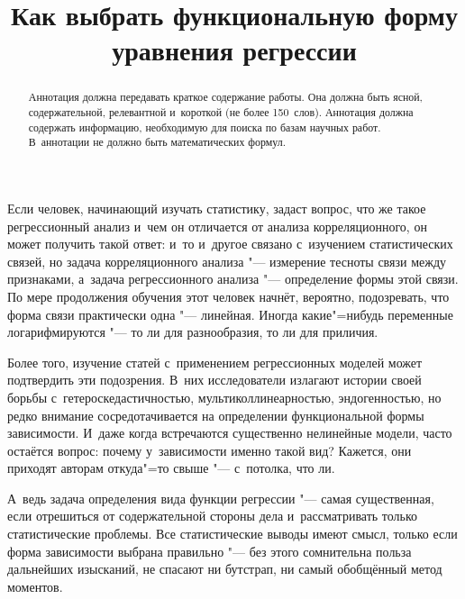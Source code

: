 \documentclass[final,pdftex]{../../template/epsilonj}
\begin{document}
	
	\begin{frontmatter}
		\title{Как выбрать функциональную форму уравнения регрессии}
		
		\begin{aug}
			\author{ }
			\address{Кафедра математической экономики и~эконометрики, НИУ ВШЭ, Москва.}
		\end{aug}
		
		\begin{abstract}
			Аннотация должна передавать краткое содержание работы.
			Она должна быть ясной, содержательной, релевантной и~короткой
			(не более 150~слов). Аннотация должна содержать информацию,
			необходимую для поиска по базам научных работ.
			В~аннотации не должно быть математических формул.
		\end{abstract}
		
		\begin{keyword}
		\end{keyword}
		
	\end{frontmatter}
	

Если человек, начинающий изучать статистику, задаст вопрос, что же такое регрессионный анализ и~чем он отличается от анализа корреляционного, он может получить такой ответ: и~то и~другое связано с~изучением статистических связей, но задача корреляционного анализа "--- измерение тесноты связи между признаками, а~задача регрессионного анализа "--- определение формы этой связи. По мере продолжения обучения этот человек начнёт, вероятно, подозревать, что форма связи практически одна "--- линейная. Иногда какие"=нибудь переменные логарифмируются "--- то ли для разнообразия, то ли для приличия.

Более того, изучение статей с~применением регрессионных моделей может подтвердить эти подозрения. В~них исследователи излагают истории своей борьбы с~гетероскедастичностью, мультиколлинеарностью, эндогенностью, но редко внимание сосредотачивается на определении функциональной формы зависимости. И~даже когда встречаются существенно нелинейные модели, часто остаётся вопрос: почему у~зависимости именно такой вид? Кажется, они приходят авторам откуда"=то свыше "--- с~потолка, что ли.

А~ведь задача определения вида функции регрессии "--- самая существенная, если отрешиться от содержательной стороны дела и~рассматривать только статистические проблемы. Все статистические выводы имеют смысл, только если форма зависимости выбрана правильно "--- без этого сомнительна польза дальнейших изысканий, не спасают ни бутстрап, ни самый обобщённый метод моментов.
\end{document}
